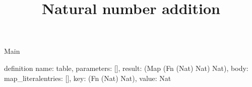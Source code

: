 \begin{lexlean}{Main}
\title{Natural number addition}
\begin{semanticmodule}
definition{
  name: table,
  parameters: [],
  result: (Map (Fn (Nat) Nat) Nat),
  body: map_literal{entries: [], key: (Fn (Nat) Nat), value: Nat}
}
\end{semanticmodule}
\end{lexlean}
